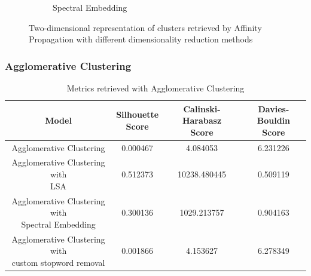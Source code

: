 \begin{figure}
\begin{subfigure}{.3\textwidth}
    \caption{Spectral Embedding}
    \label{fig:affinity_propagation_spectral}
  \end{subfigure}
  \caption{Two-dimensional representation of clusters retrieved by Affinity Propagation with different dimensionality reduction methods}
  \label{fig:affinity_propagation}
\end{figure}

\subsubsection{Agglomerative Clustering}

\begin{table}[]
  \centering
  \begin{tabular}{c|c|c|c}
    Model &  \shortstack[c]{Silhouette \\ Score} & \shortstack[c]{Calinski-Harabasz \\ Score} &  \shortstack[c]{Davies-Bouldin \\ Score}  \\
    \hline
    \hline
    Agglomerative Clustering & 0.000467 & 4.084053 & 6.231226 \\
    \hline
    \shortstack[c]{Agglomerative Clustering with \\ LSA} & 0.512373 & 10238.480445 & 0.509119 \\
    \hline
    \shortstack[c]{Agglomerative Clustering with \\ Spectral Embedding} & 0.300136 & 1029.213757 & 0.904163 \\
    \hline
    \shortstack[c]{Agglomerative Clustering with \\ custom stopword removal} & 0.001866 & 4.153627 & 6.278349 \\
   \end{tabular}
  \caption{Metrics retrieved with Agglomerative Clustering}
  \label{tab:scores_agglomerative}
\end{table}

